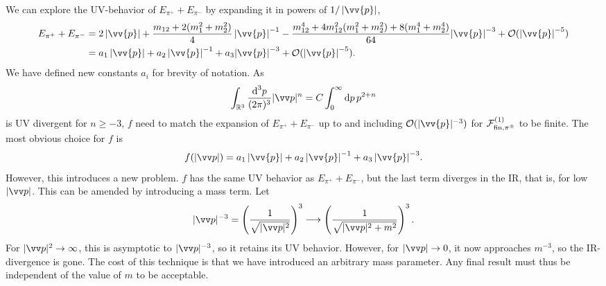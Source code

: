 We can explore the UV-behavior of $E_{\pi^+} + E_{\pi^-}$ by expanding it in powers of $1 / \abs{\vv{p}}$,
%
\begin{align}
    \nonumber
    E_{\pi^+} + E_{\pi^-}
    & = 
    2  \abs{\vv{p}}
    + \frac{m_{12} + 2(m_1^2 + m_2^2)}{4} \, {\abs{\vv{p}}}^{-1}
    - \frac{m_{12}^4 + 4 m_{12}^2(m_1^2 + m_2^2) + 8(m_1^4 + m_2^4)}{64}
    {\abs{\vv{p}}}^{-3}
    + \Oh (\abs{\vv{p}}^{-5})
    \\
    & = 
    a_1  \abs{\vv{p}}
    + a_2 \, {\abs{\vv{p}}}^{-1}
    + a_3
    {\abs{\vv{p}}}^{-3}
    + \Oh (\abs{\vv{p}}^{-5}).
\end{align}
%
We have defined new constants $a_i$ for brevity of notation.
As
%
\begin{equation}
    \int_{\R^3} \frac{\dd^3 p}{(2 \pi)^3} |\vv p|^{n}
    = C \int_{0}^\infty \dd p \, p^{2 + n}
\end{equation}
%
is UV divergent for $n \geq -3$, $f$ need to match the expansion of $E_{\pi^+} + E_{\pi^-}$ up to and including $\Oh(|\vv{p}|^{-3})$ for $\mathcal{F}^{(1)}_{\mathrm{fin}, {\pi^\pm} }$ to be finite.
The most obvious choice for $f$ is
%
\begin{equation}
    f(|\vv p|) 
    = a_1  \abs{\vv{p}} + a_2 \, {\abs{\vv{p}}}^{-1} + a_3 \, {\abs{\vv{p}}}^{-3}.
\end{equation}
%
However, this introduces a new problem.
$f$ has the same UV behavior as $E_{\pi^+} + E_{\pi^-}$, but the last term diverges in the IR, that is, for low $|\vv p|$.
This can be amended by introducing a mass term.
Let
%
\begin{equation}
    |\vv p|^{-3} 
    = 
    \left(\frac{1}{\sqrt{|\vv p|^2}}\right)^3 
    \longrightarrow 
    \left(\frac{1}{\sqrt{|\vv p|^2 + m^2}}\right)^3.
\end{equation}
%
For $|\vv p|^2 \rightarrow \infty$, this is asymptotic to $|\vv p|^{-3}$, so it retains its UV behavior.
However, for $|\vv p| \rightarrow 0$, it now approaches $m^{-3}$, so the IR-divergence is gone.
The cost of this technique is that we have introduced an arbitrary mass parameter.
Any final result must thus be independent of the value of $m$ to be acceptable.

